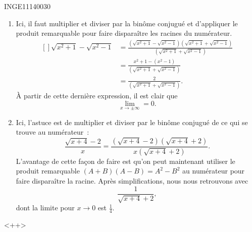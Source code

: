 

\begin{corrige}{INGE11140030}

	\begin{enumerate}

		\item
			Ici, il faut multiplier et diviser par la binôme conjugué et d'appliquer le produit remarquable pour faire disparaître les racines du numérateur.
			\begin{equation}
				\begin{aligned}[]
					\sqrt{x^2+1}-\sqrt{x^2-1}	&=		\frac{ \left(\sqrt{x^2+1}-\sqrt{x^2-1}\right) \left(\sqrt{x^2+1}+\sqrt{x^2-1}\right)  }{  \left(\sqrt{x^2+1}+\sqrt{x^2-1}\right)  }\\
					&=\frac{ x^2+1-(x^2-1) }{  \left(\sqrt{x^2+1}+\sqrt{x^2-1}\right)  }\\
					&=\frac{ 2 }{  \left(\sqrt{x^2+1}+\sqrt{x^2-1}\right)  }.
				\end{aligned}
			\end{equation}
			À partir de cette dernière expression, il est clair que
			\begin{equation}
				\lim_{x\to \pm\infty} =0.
			\end{equation}

		\item
			Ici, l'astuce est de multiplier et diviser par le binôme conjugué de ce qui se trouve au numérateur~:
			\begin{equation}
				\frac{ \sqrt{x+4}-2 }{ x }= \frac{ \left( \sqrt{x+4}-2 \right)\left( \sqrt{x+4}+2 \right)}{ x\left( \sqrt{x+4}+2 \right) }.
			\end{equation}
			L'avantage de cette façon de faire est qu'on peut maintenant utiliser le produit remarquable $(A+B)(A-B)=A^2-B^2$ au numérateur pour faire disparaître la racine. Après simplifications, nous nous retrouvons  avec
			\begin{equation}
				\frac{1}{ \sqrt{x+4}+2 },
			\end{equation}
			dont la limite pour $x\to 0$ est $\frac{1}{ 4 }$.

	\end{enumerate}
	<++>

\end{corrige}
